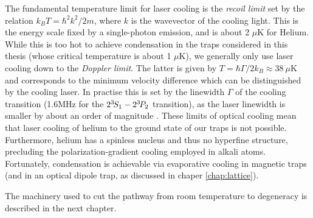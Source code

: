 
	The fundamental temperature limit for laser cooling is the \emph{recoil limit} set by the relation $k_B T = \hbar^2k^2/2m$, where $k$ is the wavevector of the cooling light.
	This is the energy scale fixed by a single-photon emission, and is about 2 $\mu$K for Helium.
	While this is too hot to achieve condensation in the traps considered in this thesis (whose critical temperature is about 1 $\mu$K), we generally only use laser cooling down to the \emph{Doppler limit}.
	The latter is given by $T = \hbar\Gamma/2 k_B\approx 38~\mu$K and corresponds to the minimum velocity difference which can be distinguished by the cooling laser.
	In practise this is set by the linewidth $\Gamma$ of the cooling transition (1.6MHz for the $2^{3\!} S_1 - 2^{3\!} P_2$ transition), as the laser linewidth is smaller by about an order of magnitude \cite{Shin16}.
	These limits of optical cooling mean that laser cooling of helium to the ground state of our traps is not possible.
	Furthermore, helium has a spinless nucleus and thus no hyperfine structure, precluding the polarization-gradient cooling employed in alkali atoms.
	Fortunately, condensation is achievable via evaporative cooling in magnetic traps (and in an optical dipole trap, as discussed in chaper \ref{chap:lattice}).

	The machinery used to cut the pathway from room temperature to degeneracy is described in the next chapter. 